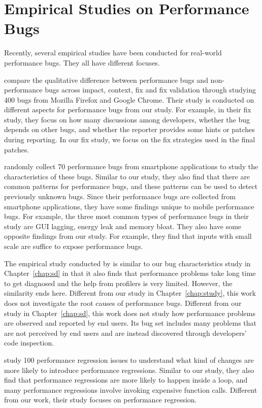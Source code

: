 \section{Empirical Studies on Performance Bugs}
\label{sec:2_study}

Recently, several empirical studies have been conducted for real-world
performance bugs. They all have different focuses.

\citet{Zaman2012MSR} compare the
qualitative difference between performance bugs and non-performance bugs 
across impact, context, fix and fix validation through studying 400 bugs from Mozilla Firefox and Google Chrome. 
Their study is conducted on different aspects for performance bugs from our study. For example, in their fix study, 
they focus on how many discussions among developers, whether the bug depends on other bugs,  
and whether the reporter provides some hints or patches during reporting. 
In our fix study, we focus on the fix strategies used in the final patches. 

\citet{SmartphoneStudy} randomly collect 70 performance bugs 
from smartphone applications to study the characteristics of these bugs. 
Similar to our study, they also find that there are common patterns for 
performance bugs, and these patterns can be used to detect previously unknown bugs. 
Since their performance bugs are collected from smartphone applications, 
they have some findings unique to mobile performance bugs. 
For example, the three most common types of performance bugs in their study are GUI lagging, energy leak and memory bloat. 
They also have some opposite findings from our study. 
For example, they find that inputs with small scale are suffice to expose performance bugs. 

The empirical study conducted by \citet{Nistor2013MSR} is similar
to our bug characteristics study in Chapter~\ref{chap:sd} 
in that it also finds that performance problems take long time
to get diagnosed and the help from profilers is very limited. However, the
similarity ends here. 
Different from our study in Chapter~\ref{chap:study}, 
this work does not investigate the root causes of performance bugs.
Different from our study in Chapter~\ref{chap:sd}, 
this work does not study how performance problems are observed and reported by end users. 
Its bug set includes many problems
that are not perceived by end users and are instead discovered through 
developers' code inspection.

\citet{HuangRegression} study 100 performance regression issues to understand
what kind of changes are more likely to introduce performance regressions. 
Similar to our study, they also find that performance regressions are more 
likely to happen inside a loop, and many performance regressions involve invoking expensive function calls. 
Different from our work, 
their study focuses on performance regression. 
